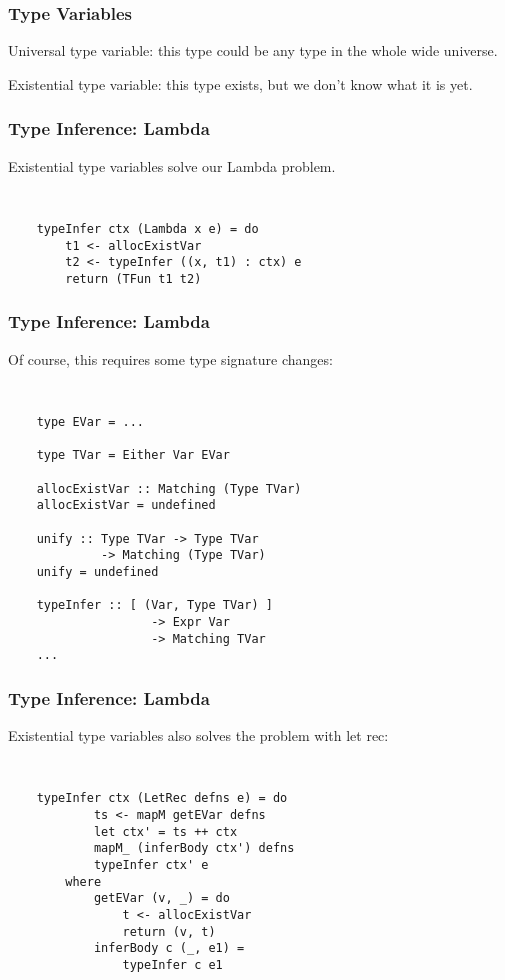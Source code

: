 \documentclass{beamer}
\begin{document}
\begin{frame}
\frametitle{Type Variables}
\Large{
\alert{Universal} type variable: this type could be any type in the
whole wide \alert{universe}.

\vspace{40pt}

\alert{Existential} type variable: this type \alert{exist}s, but we
don't know what it is yet.
}
\end{frame}

\begin{frame}[fragile]
\frametitle{Type Inference: Lambda}

\Large{
\begin{center}
Existential type variables solve our Lambda problem.
\end{center}

{\tt
\begin{verbatim}
    typeInfer ctx (Lambda x e) = do
        t1 <- allocExistVar
        t2 <- typeInfer ((x, t1) : ctx) e
        return (TFun t1 t2)
\end{verbatim}
}}
\end{frame}

\begin{frame}[fragile]
\frametitle{Type Inference: Lambda}

Of course, this requires some type signature changes:

{\tt
\begin{verbatim}
    type EVar = ...

    type TVar = Either Var EVar

    allocExistVar :: Matching (Type TVar)
    allocExistVar = undefined

    unify :: Type TVar -> Type TVar
             -> Matching (Type TVar)
    unify = undefined

    typeInfer :: [ (Var, Type TVar) ]
                    -> Expr Var
                    -> Matching TVar
    ...
\end{verbatim}
}
\end{frame}

\begin{frame}[fragile]
\frametitle{Type Inference: Lambda}

Existential type variables also solves the problem with let rec:

{\tt
\begin{verbatim}
    typeInfer ctx (LetRec defns e) = do
            ts <- mapM getEVar defns
            let ctx' = ts ++ ctx
            mapM_ (inferBody ctx') defns
            typeInfer ctx' e
        where
            getEVar (v, _) = do
                t <- allocExistVar
                return (v, t)
            inferBody c (_, e1) =
                typeInfer c e1
\end{verbatim}
}
\end{frame}
\end{document}
